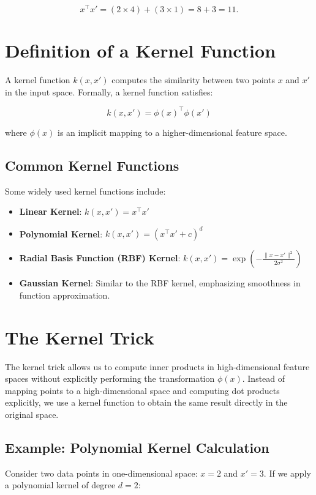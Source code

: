 \documentclass{article}
\begin{document}
\[
x^\top x' = (2 \times 4) + (3 \times 1) = 8 + 3 = 11.
\]

\section{Definition of a Kernel Function}
A kernel function \( k(x, x') \) computes the similarity between two points \( x \) and \( x' \) in the input space. Formally, a kernel function satisfies:

\[
k(x, x') = \phi(x)^\top \phi(x')
\]

where \( \phi(x) \) is an implicit mapping to a higher-dimensional feature space.

\subsection{Common Kernel Functions}
Some widely used kernel functions include:

\begin{itemize}
    \item \textbf{Linear Kernel}: \( k(x, x') = x^\top x' \)
    \item \textbf{Polynomial Kernel}: \( k(x, x') = (x^\top x' + c)^d \)
    \item \textbf{Radial Basis Function (RBF) Kernel}: \( k(x, x') = \exp\left(-\frac{\|x - x'\|^2}{2\sigma^2}\right) \)
    \item \textbf{Gaussian Kernel}: Similar to the RBF kernel, emphasizing smoothness in function approximation.
\end{itemize}

\section{The Kernel Trick}
The kernel trick allows us to compute inner products in high-dimensional feature spaces without explicitly performing the transformation \( \phi(x) \). Instead of mapping points to a high-dimensional space and computing dot products explicitly, we use a kernel function to obtain the same result directly in the original space.

\subsection{Example: Polynomial Kernel Calculation}
Consider two data points in one-dimensional space: \( x = 2 \) and \( x' = 3 \). If we apply a polynomial kernel of degree \( d = 2 \):
\end{document}
